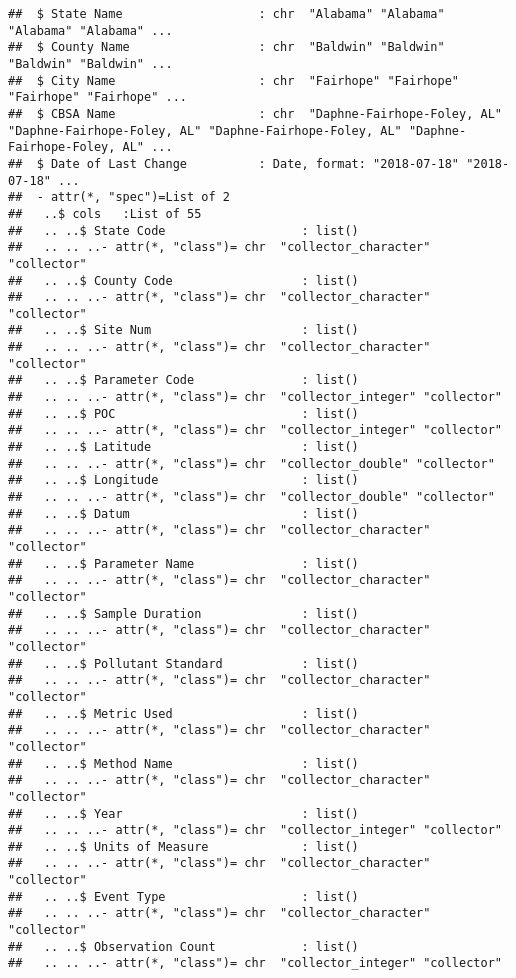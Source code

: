 \documentclass[]{article}
\begin{document}
\begin{verbatim}
##  $ State Name                   : chr  "Alabama" "Alabama" "Alabama" "Alabama" ...
##  $ County Name                  : chr  "Baldwin" "Baldwin" "Baldwin" "Baldwin" ...
##  $ City Name                    : chr  "Fairhope" "Fairhope" "Fairhope" "Fairhope" ...
##  $ CBSA Name                    : chr  "Daphne-Fairhope-Foley, AL" "Daphne-Fairhope-Foley, AL" "Daphne-Fairhope-Foley, AL" "Daphne-Fairhope-Foley, AL" ...
##  $ Date of Last Change          : Date, format: "2018-07-18" "2018-07-18" ...
##  - attr(*, "spec")=List of 2
##   ..$ cols   :List of 55
##   .. ..$ State Code                   : list()
##   .. .. ..- attr(*, "class")= chr  "collector_character" "collector"
##   .. ..$ County Code                  : list()
##   .. .. ..- attr(*, "class")= chr  "collector_character" "collector"
##   .. ..$ Site Num                     : list()
##   .. .. ..- attr(*, "class")= chr  "collector_character" "collector"
##   .. ..$ Parameter Code               : list()
##   .. .. ..- attr(*, "class")= chr  "collector_integer" "collector"
##   .. ..$ POC                          : list()
##   .. .. ..- attr(*, "class")= chr  "collector_integer" "collector"
##   .. ..$ Latitude                     : list()
##   .. .. ..- attr(*, "class")= chr  "collector_double" "collector"
##   .. ..$ Longitude                    : list()
##   .. .. ..- attr(*, "class")= chr  "collector_double" "collector"
##   .. ..$ Datum                        : list()
##   .. .. ..- attr(*, "class")= chr  "collector_character" "collector"
##   .. ..$ Parameter Name               : list()
##   .. .. ..- attr(*, "class")= chr  "collector_character" "collector"
##   .. ..$ Sample Duration              : list()
##   .. .. ..- attr(*, "class")= chr  "collector_character" "collector"
##   .. ..$ Pollutant Standard           : list()
##   .. .. ..- attr(*, "class")= chr  "collector_character" "collector"
##   .. ..$ Metric Used                  : list()
##   .. .. ..- attr(*, "class")= chr  "collector_character" "collector"
##   .. ..$ Method Name                  : list()
##   .. .. ..- attr(*, "class")= chr  "collector_character" "collector"
##   .. ..$ Year                         : list()
##   .. .. ..- attr(*, "class")= chr  "collector_integer" "collector"
##   .. ..$ Units of Measure             : list()
##   .. .. ..- attr(*, "class")= chr  "collector_character" "collector"
##   .. ..$ Event Type                   : list()
##   .. .. ..- attr(*, "class")= chr  "collector_character" "collector"
##   .. ..$ Observation Count            : list()
##   .. .. ..- attr(*, "class")= chr  "collector_integer" "collector"

\end{verbatim}
\end{document}
